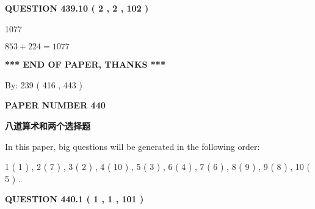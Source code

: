 \documentclass{ctexart}
\begin{document}
 
  
\vspace{0.2in}
  
{\textbf{\Large{QUESTION
439.10 
 ( 2 , 2 , 102 )
}}}
  
  
 
 
\noindent{}

1077
 
 
 
 
\noindent{}

$ %
853 +  %
224=   %
1077$
 
 
   
   
 \vspace{0.2in}
 
   
   
   
   
\vspace{1.0in} 
{\textbf{\large{ *** END OF PAPER, THANKS *** }}} 
   
   
\hspace{1.0in} By: 
 239 ( 416 ,  443 )
   
   
   
   
\newpage 
\setcounter{page}{ 
   440001 } 
   
   
   
   
 {\textbf{ \Large{ PAPER NUMBER  440  }}}
   
   
\vspace{0.2in}
   
   
   
   
   
   
 \vspace{0.2in}
{\LARGE {\textbf{ 八道算术和两个选择题}}}
   
   
   
\vspace{0.2in}
   
In this paper, big questions will be generated in the following order: 
   
   
   1 ( 1 )
 ,
   2 ( 7 )
 ,
   3 ( 2 )
 ,
   4 ( 10 )
 ,
   5 ( 3 )
 ,
   6 ( 4 )
 ,
   7 ( 6 )
 ,
   8 ( 9 )
 ,
   9 ( 8 )
 ,
   10 ( 5 )
 .
  
\vspace{0.2in}
  
{\textbf{\Large{QUESTION
440.1 
 ( 1 , 1 , 101 )
}}}
  
\end{document}
